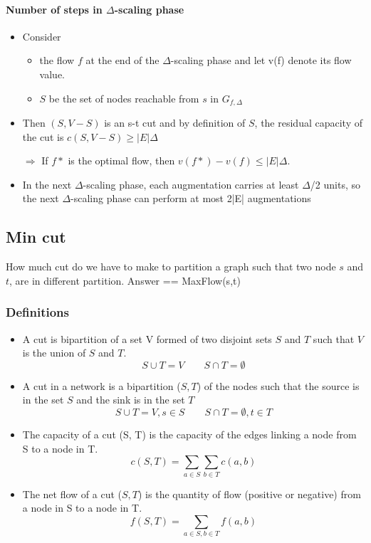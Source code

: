 \paragraph{Number of steps in $\Delta$-scaling phase}
\begin{itemize}
    \item Consider \begin{itemize}
                \item the flow $f$ at the end of the $\Delta$-scaling phase
and let v(f) denote its flow value.
                \item $S$ be the set of nodes reachable from $s$ in
                    $G_{f,\Delta}$
                    \end{itemize}
    \item Then $(S,V-S)$ is an s-t cut and by definition of $S$, the residual
capacity of the cut is $c(S,V-S) \geqslant |E|\Delta$

    \item[$\Rightarrow$] If $f*$ is the optimal flow, then $v(f*)-v(f)
        \leq |E|\Delta$.

        \item In the next $\Delta$-scaling phase, each augmentation carries
at least $\Delta$/2 units, so the next $\Delta$-scaling phase can perform at most 2|E|
augmentations
\end{itemize}

\subsection{Min cut}

How much cut do we have to make to partition a graph such that two node
$s$ and $t$, are in different partition. Answer == MaxFlow(s,t)

\subsubsection{Definitions}

\begin{itemize}
    \item A cut is bipartition of a set V formed of two disjoint sets
        $S$ and $T$ such that $V$ is the union of $S$ and $T$.
        $$S \cup T = V \quad \quad S \cap T = \emptyset $$

    \item A cut in a network is a bipartition ($S, T$) of the nodes such
        that the source is in the set $S$ and the sink is in the set $T$
        $$S \cup T = V , s\in S\quad \quad S \cap T = \emptyset, t \in
        T$$

    \item The capacity of a cut (S, T) is the capacity of the edges
        linking
        a node from S to a node in T.
        $$c(S, T) = \sum_{a\in S} \sum_{b \in T} c(a, b)$$

    \item The net flow of a cut ($S, T$) is the quantity of flow
        (positive or
        negative) from a node in S to a node in T.
        $$f(S, T) = \sum_{a\in S, b\in T} f(a, b)$$

\end{itemize}

